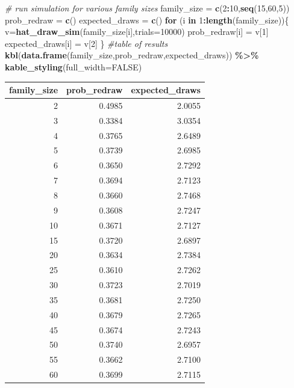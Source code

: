\documentclass[
]{book}
\newenvironment{Shaded}{\begin{snugshade}}{\end{snugshade}}
\newcommand{\AttributeTok}[1]{\textcolor[rgb]{0.13,0.29,0.53}{#1}}
\newcommand{\CommentTok}[1]{\textcolor[rgb]{0.56,0.35,0.01}{\textit{#1}}}
\newcommand{\ConstantTok}[1]{\textcolor[rgb]{0.56,0.35,0.01}{#1}}
\newcommand{\ControlFlowTok}[1]{\textcolor[rgb]{0.13,0.29,0.53}{\textbf{#1}}}
\newcommand{\DecValTok}[1]{\textcolor[rgb]{0.00,0.00,0.81}{#1}}
\newcommand{\FunctionTok}[1]{\textcolor[rgb]{0.13,0.29,0.53}{\textbf{#1}}}
\newcommand{\NormalTok}[1]{#1}
\newcommand{\OtherTok}[1]{\textcolor[rgb]{0.56,0.35,0.01}{#1}}
\newcommand{\SpecialCharTok}[1]{\textcolor[rgb]{0.81,0.36,0.00}{\textbf{#1}}}
\theoremstyle{definition}
\theoremstyle{definition}
\theoremstyle{definition}
\theoremstyle{definition}
\theoremstyle{remark}
\begin{document}
\begin{Shaded}
\begin{Highlighting}[]
\CommentTok{\# run simulation for various family sizes}
\NormalTok{family\_size }\OtherTok{=} \FunctionTok{c}\NormalTok{(}\DecValTok{2}\SpecialCharTok{:}\DecValTok{10}\NormalTok{,}\FunctionTok{seq}\NormalTok{(}\DecValTok{15}\NormalTok{,}\DecValTok{60}\NormalTok{,}\DecValTok{5}\NormalTok{))}
\NormalTok{prob\_redraw }\OtherTok{=} \FunctionTok{c}\NormalTok{()}
\NormalTok{expected\_draws }\OtherTok{=} \FunctionTok{c}\NormalTok{()}
\ControlFlowTok{for}\NormalTok{ (i }\ControlFlowTok{in} \DecValTok{1}\SpecialCharTok{:}\FunctionTok{length}\NormalTok{(family\_size))\{}
\NormalTok{  v}\OtherTok{=}\FunctionTok{hat\_draw\_sim}\NormalTok{(family\_size[i],}\AttributeTok{trials=}\DecValTok{10000}\NormalTok{)}
\NormalTok{  prob\_redraw[i] }\OtherTok{=}\NormalTok{ v[}\DecValTok{1}\NormalTok{]}
\NormalTok{  expected\_draws[i] }\OtherTok{=}\NormalTok{ v[}\DecValTok{2}\NormalTok{]}
\NormalTok{\}}
\CommentTok{\#table of results}
\FunctionTok{kbl}\NormalTok{(}\FunctionTok{data.frame}\NormalTok{(family\_size,prob\_redraw,expected\_draws)) }\SpecialCharTok{\%\textgreater{}\%} \FunctionTok{kable\_styling}\NormalTok{(}\AttributeTok{full\_width=}\ConstantTok{FALSE}\NormalTok{)}
\end{Highlighting}
\end{Shaded}

\begin{table}
\centering
\begin{tabular}[t]{r|r|r}
\hline
family\_size & prob\_redraw & expected\_draws\\
\hline
2 & 0.4985 & 2.0055\\
\hline
3 & 0.3384 & 3.0354\\
\hline
4 & 0.3765 & 2.6489\\
\hline
5 & 0.3739 & 2.6985\\
\hline
6 & 0.3650 & 2.7292\\
\hline
7 & 0.3694 & 2.7123\\
\hline
8 & 0.3660 & 2.7468\\
\hline
9 & 0.3608 & 2.7247\\
\hline
10 & 0.3671 & 2.7127\\
\hline
15 & 0.3720 & 2.6897\\
\hline
20 & 0.3634 & 2.7384\\
\hline
25 & 0.3610 & 2.7262\\
\hline
30 & 0.3723 & 2.7019\\
\hline
35 & 0.3681 & 2.7250\\
\hline
40 & 0.3679 & 2.7265\\
\hline
45 & 0.3674 & 2.7243\\
\hline
50 & 0.3740 & 2.6957\\
\hline
55 & 0.3662 & 2.7100\\
\hline
60 & 0.3699 & 2.7115\\
\hline
\end{tabular}
\end{table}
\end{document}
